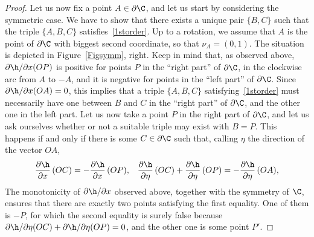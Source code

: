 \begin{proof}
Let us now fix a point $A\in \partial\C$, and let us start by considering the symmetric case. We have to show that there exists a unique pair $\{B,C\}$ such that the triple $\{A,B,C\}$ satisfies~\eqref{1storder}. Up to a rotation, we assume that $A$ is the point of $\partial\C$ with biggest second coordinate, so that $\nu_A=(0,1)$. The situation is depicted in Figure~\ref{Figsymm}, right. Keep in mind that, as observed above, $\partial\h/\partial x(OP)$ is positive for points $P$ in the ``right part'' of $\partial\C$, \ie in the clockwise arc from $A$ to $-A$, and it is negative for points in the ``left part'' of $\partial \C$. Since $\partial \h/\partial x(OA)=0$, this implies that a triple $\{A,B,C\}$ satisfying~\eqref{1storder} must necessarily have one between $B$ and $C$ in the ``right part'' of $\partial\C$, and the other one in the left part. Let us now take a point $P$ in the right part of $\partial\C$, and let us ask ourselves whether or not a suitable triple may exist with $B=P$. This happens if and only if there is some $C\in\partial\C$ such that, calling $\eta$ the direction of the vector $OA$,
\begin{align}\label{devsod}
\frac{\partial\h}{\partial x}\, (OC) = -\frac{\partial\h}{\partial x}\, (OP), && \frac{\partial\h}{\partial \eta}\, (OC) +\frac{\partial\h}{\partial \eta}\, (OP) = -\frac{\partial\h}{\partial \eta}\, (OA),
\end{align}
The monotonicity of $\partial\h/\partial x$ observed above, together with the symmetry of $\C$, ensures that there are exactly two points satisfying the first equality. One of them is $-P$, for which the second equality is surely false because $\partial \h/\partial\eta(OC) +\partial \h/\partial\eta(OP)=0$, and the other one is some point $P'$.


\end{proof}
